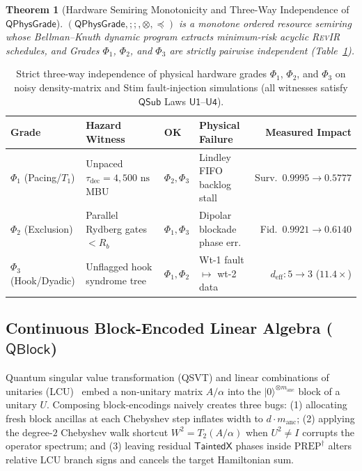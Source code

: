 \documentclass[acmsmall,screen,anonymous]{acmart}
\DeclareRobustCommand{\_}{\ifmmode\text{\char95}\else\char95\penalty0\relax\fi}
\theoremstyle{plain}
\newtheorem{theorem}{Theorem}[section]
\newcommand{\RevIR}{\textsc{RevIR}}
\newcommand{\QSub}{\ensuremath{\mathsf{QSub}}}
\newcommand{\QPhysGrade}{\ensuremath{\mathsf{QPhysGrade}}}
\newcommand{\QBlock}{\ensuremath{\mathsf{QBlock}}}
\newcommand{\CapTaintedX}{\ensuremath{\mathsf{TaintedX}}}
\begin{document}
\begin{theorem}[Hardware Semiring Monotonicity and Three-Way Independence of $\QPhysGrade$]
\label{thm:t3}
$(\QPhysGrade, \mathbin{;;}, \otimes, \preceq)$ is a monotone ordered resource semiring whose Bellman--Knuth dynamic program extracts minimum-risk acyclic \RevIR{} schedules, and Grades $\Phi_1$, $\Phi_2$, and $\Phi_3$ are strictly pairwise independent (Table~\ref{tab:t12}).
\end{theorem}

\begin{table}[t]
\centering
\caption{Strict three-way independence of physical hardware grades $\Phi_1$, $\Phi_2$, and $\Phi_3$ on noisy density-matrix and Stim fault-injection simulations (all witnesses satisfy $\QSub$ Laws $\mathsf{U1}$--$\mathsf{U4}$).}
\label{tab:t12}
\footnotesize
\setlength{\tabcolsep}{4pt}
\begin{tabular}{llllr}
\toprule
Grade & Hazard Witness & OK & Physical Failure & Measured Impact \\
\midrule
$\Phi_1$ (Pacing/$T_1$) & Unpaced $\tau_{\mathrm{dec}}{=}4{,}500\text{ ns}$ MBU & $\Phi_2,\Phi_3$ & Lindley FIFO backlog stall & Surv.\ $0.9995 \to 0.5777$ \\
$\Phi_2$ (Exclusion) & Parallel Rydberg gates $< R_b$ & $\Phi_1,\Phi_3$ & Dipolar blockade phase err. & Fid.\ $0.9921 \to 0.6140$ \\
$\Phi_3$ (Hook/Dyadic) & Unflagged hook syndrome tree & $\Phi_1,\Phi_2$ & Wt-1 fault $\mapsto$ wt-2 data & $d_{\mathrm{eff}}: 5 \to 3$ ($11.4\times$) \\
\bottomrule
\end{tabular}
\end{table}

\subsection{Continuous Block-Encoded Linear Algebra ($\QBlock$)}
\label{sec:qblock}

Quantum singular value transformation (QSVT) and linear combinations of unitaries (LCU)~\cite{gilyen2019,lowchuang2019,lee2021thc} embed a non-unitary matrix $A/\alpha$ into the $|0\rangle^{\otimes m_{\mathrm{anc}}}$ block of a unitary $U$. Composing block-encodings naively creates three bugs: (1) allocating fresh block ancillas at each Chebyshev step inflates width to $d \cdot m_{\mathrm{anc}}$; (2) applying the degree-$2$ Chebyshev walk shortcut $W^2 = T_2(A/\alpha)$ when $U^2 \neq I$ corrupts the operator spectrum; and (3) leaving residual $\CapTaintedX$ phases inside $\mathrm{PREP}^\dagger$ alters relative LCU branch signs and cancels the target Hamiltonian sum.
\end{document}

